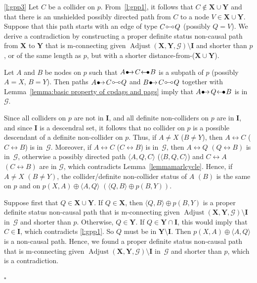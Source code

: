\documentclass[11pt,a4paper]{article}
\newenvironment{proofof}[1][]{\begin{trivlist}
   \item[\hskip \labelsep {\bfseries Proof of #1.}]}{\hfill{}$\square$\end{trivlist}}
\DeclareMathOperator{\Adjust}{Adjust}
\newcommand{\g}[1][G]{\mathcal{#1}}
\newcommand{\adjustb}[2][X,Y]{\Adjust(\mathbf{#1},#2)}
\newcommand{\bulletarrow}{
  \setlength{\unitlength}{1mm}
  \begin{picture}(5,1)(0,0)
    \put(0.2,0){$\bullet$}
    \put(1,0){$\rightarrow$}
  \end{picture}
}
\newcommand{\arrowbullet}{
  \setlength{\unitlength}{1mm}
  \begin{picture}(5,1)(0,0)
    \put(0.2,0){$\leftarrow$}
    \put(3,0){$\bullet$}
  \end{picture}
}
\newcommand{\circcirc}{
  \setlength{\unitlength}{1mm}
  \begin{picture}(5,1)(0,0)
    \put(1,1){\circle{1}}
    \put(1.5,1){\line(1,0){2}}
    \put(4,1){\circle{1}}
  \end{picture}
}
\begin{document}
\begin{proofof}[Lemma~\ref{lemma:general path proof}]
\ref{l:gpp3} Let $C$ be a collider on $p$. From~\ref{l:gpp1}, it follows that $C \notin \mathbf{X} \cup \mathbf{Y}$ and that there is an unshielded possibly directed path from $C$ to a node $V \in \mathbf{X} \cup \mathbf{Y}$. Suppose that this path starts with an edge of type $C \circcirc Q$ (possibly $Q =V$). We derive a contradiction by constructing a proper definite status non-causal path from $\mathbf{X}$ to $\mathbf{Y}$ that is m-connecting given $\adjustb{\g} \setminus \mathbf{I}$ and shorter than $p$, or of the same length as $p$, but with a shorter distance-from-($\mathbf{X} \cup \mathbf{Y}$).

Let $A$ and $B$ be nodes on $p$ such that $A \bulletarrow C \arrowbullet B$ is a subpath of $p$ (possibly $A=X$, $B=Y$).
Then paths $A \bulletarrow C \circcirc Q$ and $B \bulletarrow C \circcirc Q$ together with Lemma~\ref{lemma:basic property of cpdags and pags} imply that $A \bulletarrow Q \arrowbullet B$ is in~$\g$.

Since all colliders on $p$ are not in $\mathbf{I}$, and all definite non-colliders on $p$ are in $\mathbf{I}$, and since $\mathbf{I}$ is a descendral set, it follows that no collider on $p$ is a possible descendant of a definite non-collider on $p$.
Thus, if $A \neq X$ ($B \neq Y$), then $A \leftrightarrow C$ ($C \leftrightarrow B$) is in~$\g$. Moreover, if $A \leftrightarrow C$ ($C \leftrightarrow B$) is in~$\g$,  then $A \leftrightarrow Q$ $(Q \leftrightarrow B)$ is in~$\g$, otherwise a possibly directed path $\langle A,Q,C \rangle$ ($\langle B,Q,C \rangle$) and $C \leftrightarrow A$ $(C \leftrightarrow B)$ are in $\g$, which contradicts Lemma~\ref{lemmamarlcycle}.
Hence, if $A \neq X$ $(B \neq Y)$, the collider/definite non-collider status of $A$ $(B)$ is the same on $p$ and on $p(X,A) \oplus \langle A,Q\rangle$ $(\langle Q, B \rangle \oplus p(B,Y))$.

Suppose first that $Q \in \mathbf{X} \cup \mathbf{Y}$.
If $Q \in \mathbf{X}$, then $\langle Q,B \rangle \oplus p(B,Y)$ is a proper definite status non-causal path that is m-connecting given $\adjustb{\g} \setminus \mathbf{I}$ in~$\g$ and shorter than $p$.
Otherwise, $Q \in \mathbf{Y}$. If $Q \in \mathbf{Y} \cap \mathbf{I}$, this would imply that $C \in \mathbf{I}$, which contradicts \ref{l:gpp1}. So $Q$ must be in $\mathbf{Y} \setminus \mathbf{I}$. Then $p(X,A) \oplus \langle A,Q \rangle$ is a non-causal path. Hence, we found a proper definite status non-causal path that is m-connecting given $\adjustb{\g} \setminus \mathbf{I}$ in~$\g$ and shorter than $p$, which is a contradiction.


\end{proofof}
\end{document}
